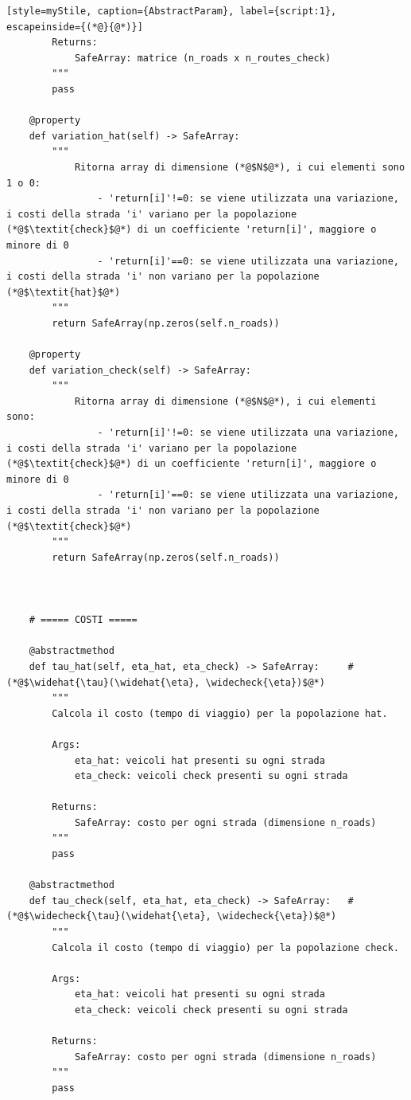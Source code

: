 \begin{lstlisting}[style=myStile, caption={AbstractParam}, label={script:1}, escapeinside={(*@}{@*)}]
        Returns:
            SafeArray: matrice (n_roads x n_routes_check)
        """
        pass

    @property
    def variation_hat(self) -> SafeArray:
        """
            Ritorna array di dimensione (*@$N$@*), i cui elementi sono 1 o 0:
                - 'return[i]'!=0: se viene utilizzata una variazione, i costi della strada 'i' variano per la popolazione (*@$\textit{check}$@*) di un coefficiente 'return[i]', maggiore o minore di 0
                - 'return[i]'==0: se viene utilizzata una variazione, i costi della strada 'i' non variano per la popolazione (*@$\textit{hat}$@*)
        """
        return SafeArray(np.zeros(self.n_roads))

    @property
    def variation_check(self) -> SafeArray:
        """
            Ritorna array di dimensione (*@$N$@*), i cui elementi sono:
                - 'return[i]'!=0: se viene utilizzata una variazione, i costi della strada 'i' variano per la popolazione (*@$\textit{check}$@*) di un coefficiente 'return[i]', maggiore o minore di 0
                - 'return[i]'==0: se viene utilizzata una variazione, i costi della strada 'i' non variano per la popolazione (*@$\textit{check}$@*)
        """
        return SafeArray(np.zeros(self.n_roads))



    # ===== COSTI =====
    
    @abstractmethod
    def tau_hat(self, eta_hat, eta_check) -> SafeArray:     #(*@$\widehat{\tau}(\widehat{\eta}, \widecheck{\eta})$@*)
        """
        Calcola il costo (tempo di viaggio) per la popolazione hat.
        
        Args:
            eta_hat: veicoli hat presenti su ogni strada
            eta_check: veicoli check presenti su ogni strada
        
        Returns:
            SafeArray: costo per ogni strada (dimensione n_roads)
        """
        pass

    @abstractmethod
    def tau_check(self, eta_hat, eta_check) -> SafeArray:   #(*@$\widecheck{\tau}(\widehat{\eta}, \widecheck{\eta})$@*)
        """
        Calcola il costo (tempo di viaggio) per la popolazione check.
        
        Args:
            eta_hat: veicoli hat presenti su ogni strada
            eta_check: veicoli check presenti su ogni strada
        
        Returns:
            SafeArray: costo per ogni strada (dimensione n_roads)
        """
        pass
    

\end{lstlisting}

